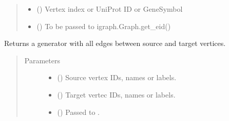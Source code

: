 \documentclass[letterpaper,10pt,english]{sphinxmanual}
\begin{document}
\begin{fulllineitems}
\begin{fulllineitems}
\begin{quote}
\begin{description}
\begin{itemize}
\item {} 
 (\sphinxstyleliteralemphasis{\sphinxupquote{,}}) \textendash{} Vertex index or UniProt ID or GeneSymbol

\item {} 
 () \textendash{} To be passed to igraph.Graph.get\_eid()

\end{itemize}

\end{description}\end{quote}

\end{fulllineitems}


\begin{fulllineitems}
\label{\detokenize{main:pypath.main.PyPath.get_edges}}
Returns a generator with all edges between source and target vertices.
\begin{quote}\begin{description}
\item[{Parameters}] \leavevmode\begin{itemize}
\item {} 
 () \textendash{} Source vertex IDs, names or labels.

\item {} 
 () \textendash{} Target vertec IDs, names or labels.

\item {} 
 () \textendash{} Passed to .

\end{itemize}

\end{description}\end{quote}

\end{fulllineitems}


\end{fulllineitems}
\end{document}

